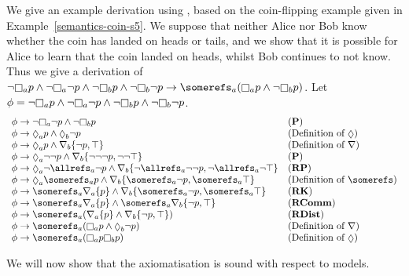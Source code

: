 \begin{example}\label{k-example}
We give an example derivation using \axiomKF{}, based on the coin-flipping
example given in Example~\ref{semantics-coin-s5}. We suppose that neither Alice
nor Bob know whether the coin has landed on heads or tails, and we show that it
is possible for Alice to learn that the coin landed on heads, whilst Bob
continues to not know. Thus we give a derivation of $\neg \knows_a p \land \neg
\knows_a \neg p \land \neg \knows_b p \land \neg \knows_b \neg p \implies
\somerefs_a (\knows_a p \land \neg \knows_b p)$. Let $\phi = \neg \knows_a p \land \neg
\knows_a \neg p \land \neg \knows_b p \land \neg \knows_b \neg p$.
$$
\begin{array}{ll}
\phi \implies \neg
\knows_a \neg p \land \neg \knows_b p & \text{({\bf P})}\\
\phi \implies
\suspects_a p \land \suspects_b \neg p & \text{(Definition of $\suspects$)}\\
\phi \implies
\suspects_a p \land \covers_b \{\neg p, \top\} & \text{(Definition of $\covers$)}\\
\phi \implies
\suspects_a \neg \neg p \land \covers_b \{\neg \neg \neg p, \neg \neg \top\} &
\text{({\bf P})}\\
\phi \implies
\suspects_a \neg \allrefs_a \neg p \land \covers_b \{\neg \allrefs_a \neg \neg
p, \neg \allrefs_a \neg \top\} & \text{({\bf RP})}\\
\phi \implies
\suspects_a \somerefs_a p \land \covers_b \{\somerefs_a \neg
p, \somerefs_a \top\} & \text{(Definition of $\somerefs$)}\\
\phi \implies
\somerefs_a \covers_a \{p\} \land \covers_b \{\somerefs_a \neg
p, \somerefs_a \top\} & \text{({\bf RK})}\\
\phi \implies
\somerefs_a \covers_a \{p\} \land \somerefs_a \covers_b \{\neg
p, \top\} & \text{({\bf RComm})}\\
\phi \implies
\somerefs_a (\covers_a \{p\} \land \covers_b \{\neg
p, \top\}) & \text{({\bf RDist})}\\
\phi \implies
\somerefs_a (\knows_a p \land \suspects_b \neg
p) & \text{(Definition of $\covers$)}\\
\phi \implies
\somerefs_a (\knows_a p \knows_b p) & \text{(Definition of $\suspects$)}\\
\end{array}
$$
\end{example}

We will now show that the axiomatisation is sound with respect to \classK{}
models.


